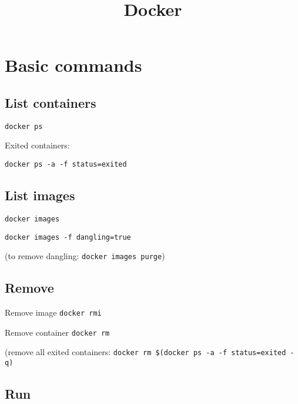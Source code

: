 


\title{Docker}


\date{}


\maketitle

\justify

\renewcommand{\abstractname}{}

\begin{abstract}

\end{abstract}



\section*{Basic commands}

\subsection*{List containers}

\texttt{docker ps}

Exited containers: 

\texttt{docker ps -a -f status=exited}



\subsection*{List images}

\texttt{docker images}

\texttt{docker images -f dangling=true}

(to remove dangling: \texttt{docker images purge})


\subsection*{Remove}

Remove image \texttt{docker rmi}

Remove container \texttt{docker rm}

(remove all exited containers: \texttt{docker rm \$(docker ps -a -f status=exited -q)}


\subsection*{Run}



